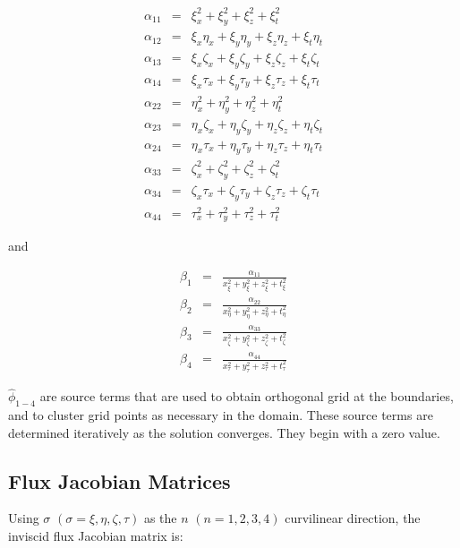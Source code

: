 \begin{eqnarray}
\alpha_{11} &=& \xi_x^2 + \xi_y^2 + \xi_z^2 + \xi_t^2
\nonumber
\\
\alpha_{12} &=& \xi_x \eta_x + \xi_y \eta_y + \xi_z \eta_z + \xi_t \eta_t
\nonumber
\\
\alpha_{13} &=& \xi_x \zeta_x + \xi_y \zeta_y + \xi_z \zeta_z + \xi_t \zeta_t
\nonumber
\\
\alpha_{14} &=& \xi_x \tau_x + \xi_y \tau_y + \xi_z \tau_z + \xi_t \tau_t
\nonumber
\\
\alpha_{22} &=& \eta_x^2 + \eta_y^2 + \eta_z^2 + \eta_t^2
\nonumber
\\
\alpha_{23} &=& \eta_x \zeta_x + \eta_y \zeta_y + \eta_z \zeta_z + \eta_t \zeta_t
\nonumber
\\
\alpha_{24} &=& \eta_x \tau_x + \eta_y \tau_y + \eta_z \tau_z + \eta_t \tau_t
\nonumber
\\
\alpha_{33} &=& \zeta_x^2 + \zeta_y^2 + \zeta_z^2 + \zeta_t^2
\nonumber
\\
\alpha_{34} &=& \zeta_x \tau_x + \zeta_y \tau_y + \zeta_z \tau_z + \zeta_t \tau_t
\nonumber
\\
\alpha_{44} &=& \tau_x^2 + \tau_y^2 + \tau_z^2 + \tau_t^2
\nonumber
\end{eqnarray}

and

\begin{eqnarray}
\beta_1 &=& 
\frac{\alpha_{11}}{
x_{\xi}^2
+
y_{\xi}^2
+
z_{\xi}^2
+
t_{\xi}^2
}
\nonumber
\\
\beta_2 &=& 
\frac{\alpha_{22}}{
x_{\eta}^2
+
y_{\eta}^2
+
z_{\eta}^2
+
t_{\eta}^2
}
\nonumber
\\
\beta_3 &=& 
\frac{\alpha_{33}}{
x_{\zeta}^2
+
y_{\zeta}^2
+
z_{\zeta}^2
+
t_{\zeta}^2
}
\nonumber
\\
\beta_4 &=& 
\frac{\alpha_{44}}{
x_{\tau}^2
+
y_{\tau}^2
+
z_{\tau}^2
+
t_{\tau}^2
}
\nonumber
\end{eqnarray}

$\widehat{\phi}_{1-4}$ are source terms that are used to obtain
orthogonal grid at the boundaries, and to cluster grid points as
necessary in the domain.  These source terms are determined iteratively
as the solution converges.  They begin with a zero value.

\subsection{Flux Jacobian Matrices}

Using $\sigma$ $\left(\sigma = \xi, \eta, \zeta, \tau \right)$ as the $n$ 
$\left(n = 1, 2, 3, 4 \right)$  curvilinear direction, the inviscid
flux Jacobian matrix is:


